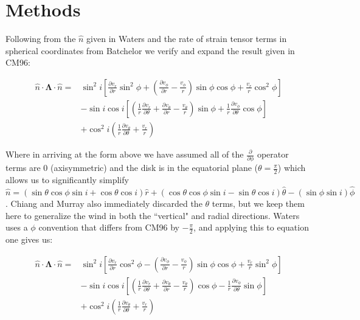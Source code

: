 \documentclass[12pt, a4paper]{article}
\begin{document}
\section{Methods}
Following from the $\hat{n}$ given in Waters and the rate of strain tensor terms in spherical coordinates from Batchelor we verify and expand the result given in CM96:

\begin{equation} \label{eq1}
\begin{split}
\hat{n}\cdot\boldsymbol{\Lambda}\cdot\hat{n} = & \sin^2i\left[\frac{\partial v_r}{\partial r}\sin^2\phi +
\left(\frac{\partial v_\phi}{\partial r} - \frac{v_\phi}{r}\right)\sin\phi\cos\phi + \frac{v_r}{r}\cos^2\phi \right] \\
& -\sin i\cos i\left[\left(\frac{1}{r}\frac{\partial v_r}{\partial \theta} + \frac{\partial v_\theta}{\partial r} - \frac{v_\theta}{r}\right)\sin\phi  + \frac{1}{r}\frac{\partial v_\phi}{\partial \theta}\cos\phi\right] \\
& +\cos^2i\left(\frac{1}{r}\frac{\partial v_\theta}{\partial \theta} + \frac{v_r}{r}\right)
\end{split}
\end{equation}

Where in arriving at the form above we have assumed all of the $\frac{\partial}{\partial \phi}$ operator terms are 0 (axisymmetric) and the disk is in the equatorial plane ($\theta = \frac{\pi}{2}$) which allows us to significantly simplify $\hat{n} = \left(\sin\theta\cos\phi\sin i + \cos\theta\cos i\right)\hat{r} + \left(\cos\theta\cos\phi\sin i - \sin\theta\cos i\right)\hat{\theta} - \left(\sin\phi\sin i\right)\hat{\phi}$. Chiang and Murray also immediately discarded the $\theta$ terms, but we keep them here to generalize the wind in both the ``vertical" and radial directions. Waters uses a $\phi$ convention that differs from CM96 by $-\frac{\pi}{2}$, and applying this to equation one gives us:

\begin{equation} \label{eq2}
\begin{split}
\hat{n}\cdot\boldsymbol{\Lambda}\cdot\hat{n} = & \sin^2i\left[\frac{\partial v_r}{\partial r}\cos^2\phi - \left(\frac{\partial v_\phi}{\partial r} - \frac{v_\phi}{r}\right)\sin\phi\cos\phi + \frac{v_r}{r}\sin^2\phi \right] \\
& -\sin i\cos i\left[\left(\frac{1}{r}\frac{\partial v_r}{\partial \theta} + \frac{\partial v_\theta}{\partial r} - \frac{v_\theta}{r}\right) \cos\phi - \frac{1}{r}\frac{\partial v_\phi}{\partial \theta}\sin\phi\right] \\
& +\cos^2i\left(\frac{1}{r}\frac{\partial v_\theta}{\partial \theta} + \frac{v_r}{r}\right)
\end{split}
\end{equation}
\end{document}
